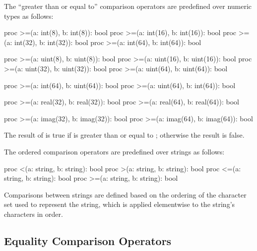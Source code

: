 The ``greater than or equal to'' comparison operators are predefined
over numeric types as follows:
\begin{chapel}
proc >=(a: int(8), b: int(8)): bool
proc >=(a: int(16), b: int(16)): bool
proc >=(a: int(32), b: int(32)): bool
proc >=(a: int(64), b: int(64)): bool

proc >=(a: uint(8), b: uint(8)): bool
proc >=(a: uint(16), b: uint(16)): bool
proc >=(a: uint(32), b: uint(32)): bool
proc >=(a: uint(64), b: uint(64)): bool

proc >=(a: int(64), b: uint(64)): bool
proc >=(a: uint(64), b: int(64)): bool

proc >=(a: real(32), b: real(32)): bool
proc >=(a: real(64), b: real(64)): bool

proc >=(a: imag(32), b: imag(32)): bool
proc >=(a: imag(64), b: imag(64)): bool
\end{chapel}
The result of  is true if  is greater than or
equal to ; otherwise the result is false.

The ordered comparison operators are predefined over strings as follows:
\begin{chapel}
proc <(a: string, b: string): bool
proc >(a: string, b: string): bool
proc <=(a: string, b: string): bool
proc >=(a: string, b: string): bool
\end{chapel}
Comparisons between strings are defined based on the ordering of the
character set used to represent the string, which is applied
elementwise to the string's characters in order.


\subsection{Equality Comparison Operators}
\label{Equality_Comparison_Operators}

